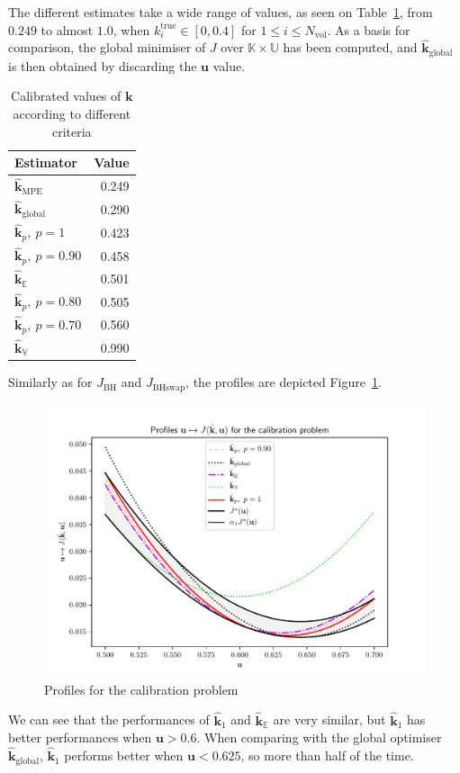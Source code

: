 \documentclass[preprint, 1p]{elsarticle}
\newcommand{\Ex}{\mathbb{E}}
\newcommand{\Prob}{\mathbb{P}}
\newcommand{\hatkmean}{\hat{\mathbf{k}}_{\Ex}}
\newcommand{\hatkvar}{\hat{\mathbf{k}}_{\mathbb{V}}}
\newcommand{\hatkmpe}{\hat{\mathbf{k}}_{\mathrm{MPE}}}
\newcommand{\kest}{\hat{\mathbf{k}}}
\newcommand{\hatkp}{\hat{\mathbf{k}}_p}
\newcommand{\Kspace}{\mathbb{K}}
\newcommand{\Uspace}{\mathbb{U}}
\newcommand{\JBH}{J_{\mathrm{BH}}}
\newcommand{\JBHS}{J_{\mathrm{BHswap}}}
\begin{document}
The different estimates take a wide range of values, as seen on Table~\ref{tab:recap_estimates_metaSWE}, from $0.249$ to almost $1.0$, when $k_i^{\mathrm{true}} \in [0, 0.4]$ for $1\leq i \leq N_{\mathrm{vol}}$.
As a basis for comparison, the global minimiser of $J$ over $\Kspace \times \Uspace$ has been computed, and $\kest_{\mathrm{global}}$ is then obtained by discarding the $\mathbf{u}$ value.



\begin{table}[!h]
\centering
\caption{Calibrated values of $\mathbf{k}$ according to different criteria}
\begin{tabular}{lr} \toprule
Estimator & Value \\ \midrule
$\hatkmpe$ & 0.249 \\
$\kest_{\mathrm{global}}$ & 0.290 \\
$\hatkp,~p=1$ & 0.423 \\ 
$\hatkp,~p=0.90$ & 0.458 \\ 
$\hatkmean$ & 0.501 \\ 
$\hatkp,~p=0.80$ & 0.505 \\ 
$\hatkp,~p=0.70$ & 0.560 \\ 
$\hatkvar$ & 0.990\\ \bottomrule
\end{tabular}
\label{tab:recap_estimates_metaSWE}
\end{table}
Similarly as for $\JBH$ and $\JBHS$, the profiles are depicted Figure~\ref{fig:profiles_swe}.
\begin{figure}[!h]
  \centering
  \includegraphics[width=.8\textwidth]{Figures/profile_swe}
  \caption{Profiles for the calibration problem}
\label{fig:profiles_swe}
\end{figure}
We can see that the performances of $\kest_1$ and $\hatkmean$ are very similar, but $\kest_1$ has better performances when $\mathbf{u} > 0.6$. When comparing with the global optimiser $\kest_{\mathrm{global}}$, $\kest_1$ performs better when $\mathbf{u}<0.625$, so more than half of the time. %
\end{document}

